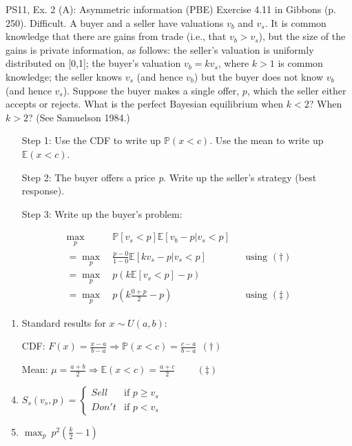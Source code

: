 \begin{frame}{PS11, Ex. 2 (A): Asymmetric information (PBE)}
    Exercise 4.11 in Gibbons (p. 250). Difficult. A buyer and a seller have valuations $v_b$ and $v_s$. It is common knowledge that there are gains from trade (i.e., that $v_b > v_s$), but the size of the gains is private information, as follows: the seller’s valuation is uniformly distributed on [0,1]; the buyer’s valuation $v_b = kv_s$, where $k > 1$ is common knowledge; the seller knows $v_s$ (and hence $v_b$) but the buyer does not know $v_b$ (and hence $v_s$). Suppose the buyer makes a single offer, $p$, which the seller either accepts or rejects. What is the perfect Bayesian equilibrium when $k < 2$? When $k > 2$? (See Samuelson 1984.) \vspace{-8pt}
    \begin{multicols}{2}
      \begin{itemize}
        \item[Step 1:] Use the CDF to write up $\mathbb{P}(x<c)$. Use the mean to write up $\mathbb{E}(x<c)$.
        \item[Step 2:] The buyer offers a price \textit{p}. Write up the seller's strategy (best response).
        \item[Step 3:] Write up the buyer's problem:
      \end{itemize} \vspace{-8pt}
      \begin{align*}
        \displaystyle{\max_p}&\ \mathbb{P}[v_s<p]\mathbb{E}[v_b-p|v_s<p]\\
       =\displaystyle{\max_p}&\ \frac{p-0}{1-0}\mathbb{E}[kv_s-p|v_s<p]&&\text{using }(\dagger)\\
       =\displaystyle{\max_p}&\ p\left(k\mathbb{E}[v_s<p]-p\right)\\
       =\displaystyle{\max_p}&\ p\left(k\frac{0+p}{2}-p\right)&&\text{using }(\ddagger)
      \end{align*}
      \vfill\null\columnbreak
      \begin{enumerate}
        \item Standard results for $x\sim U(a, b):$
        \item[CDF:] $F(x)=\frac{x-a}{b-a}\Rightarrow\mathbb{P}(x<c)=\frac{c-a}{b-a}\ \ (\dagger)$
        \item[Mean:] $\mu=\frac{a+b}{2}\Rightarrow\mathbb{E}(x<c)=\frac{a+c}{2}\quad\quad\ (\ddagger)$
        \item $S_s(v_s,p)=\left\{\begin{array}{ll}
          Sell  & \text{if }p\geq v_s \\
          Don't & \text{if }p < v_s
        \end{array}\right.$
        \item $\displaystyle{\max_p}\ p^2\left(\frac{k}{2}-1\right)$
      \end{enumerate}
      \vfill\null
    \end{multicols}
\end{frame}
